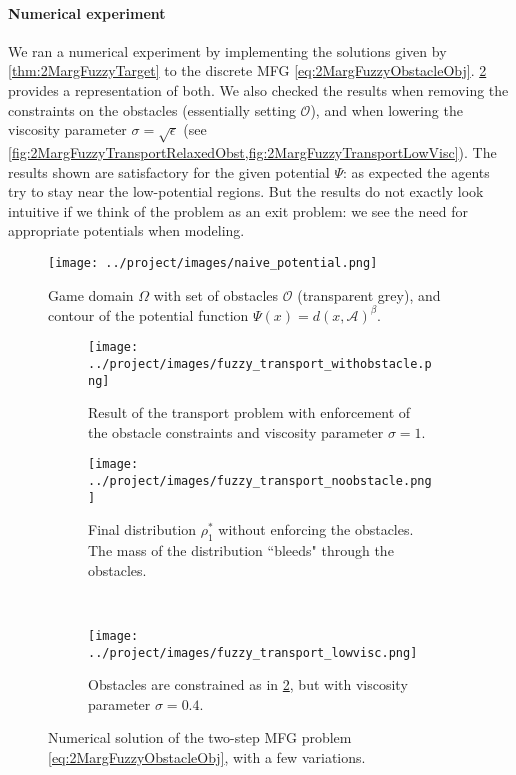 \documentclass[../report.tex]{subfiles}
\begin{document}
\paragraph{Numerical experiment} We ran a numerical experiment by implementing the solutions given by \cref{thm:2MargFuzzyTarget} to the discrete MFG \eqref{eq:2MargFuzzyObstacleObj}. \cref{fig:2MargFuzzyTransportObstacles} provides a representation of both. We also checked the results when removing the constraints on the obstacles (essentially setting $\mathscr{O}$), and when lowering the viscosity parameter $\sigma = \sqrt{\epsilon}$ (see \cref{fig:2MargFuzzyTransportRelaxedObst,fig:2MargFuzzyTransportLowVisc}). The results shown are satisfactory for the given potential $\Psi$: as expected the agents try to stay near the low-potential regions. But the results do not exactly look intuitive if we think of the problem as an exit problem: we see the need for appropriate potentials when modeling.

\begin{figure}[h]
	\centering
	\texttt{[image: ../project/images/naive\_potential.png]}
	\caption{Game domain $\Omega$ with set of obstacles $\mathscr{O}$ (transparent grey), and contour of the potential function $\Psi(x) = d(x, \mathscr A)^\beta$.} \label{fig:CrowdExamplePotential}	
\end{figure}


\begin{figure}[h]
	\centering
	\begin{subfigure}[t]{.70\linewidth}
	\texttt{[image: ../project/images/fuzzy\_transport\_withobstacle.png]}
	\caption{Result of the transport problem with enforcement of the obstacle constraints and viscosity parameter $\sigma=1$.}\label{fig:2MargFuzzyTransportObstacles}
	\end{subfigure}
	\begin{subfigure}[t]{.34\linewidth}
	\centering
	\texttt{[image: ../project/images/fuzzy\_transport\_noobstacle.png]}
	\caption{Final distribution $\rho^*_1$ without enforcing the obstacles. The mass of the distribution ``bleeds" through the obstacles. }\label{fig:2MargFuzzyTransportRelaxedObst}
	\end{subfigure}~
	\begin{subfigure}[t]{.34\linewidth}
	\centering
	\texttt{[image: ../project/images/fuzzy\_transport\_lowvisc.png]}
	\caption{Obstacles are constrained as in \cref{fig:2MargFuzzyTransportObstacles}, but with viscosity parameter $\sigma=0.4$.}\label{fig:2MargFuzzyTransportLowVisc}
	\end{subfigure}
	\caption{Numerical solution of the two-step MFG problem \eqref{eq:2MargFuzzyObstacleObj}, with a few variations.}\label{fig:2MargFuzzyTransportMarginals}
\end{figure}
\end{document}
